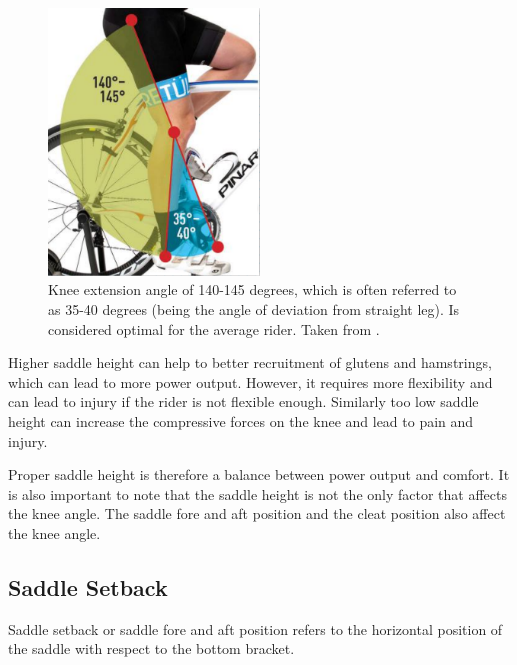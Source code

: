 \begin{figure}[htbp]
    \centering
    \includegraphics[width=0.5\textwidth]{obrazky-figures/burt_knee_angle.png}
    \caption{Knee extension angle of 140-145 degrees, which is often referred to as 35-40 degrees (being the angle of deviation from straight leg). Is considered optimal for the average rider. Taken from \cite{burtbikefit}.}
    \label{fig:saddle_height}
\end{figure}



Higher saddle height can help to better recruitment of glutens and hamstrings, which can lead to more power output. However, it requires more flexibility and can lead to injury if the rider is not flexible enough. Similarly too low saddle height can increase the compressive forces on the knee and lead to pain and injury.

Proper saddle height is therefore a balance between power output and comfort. It is also important to note that the saddle height is not the only factor that affects the knee angle. The saddle fore and aft position and the cleat position also affect the knee angle.

\subsection{Saddle Setback}
Saddle setback or saddle fore and aft position refers to the horizontal position of the saddle with respect to the bottom bracket.


